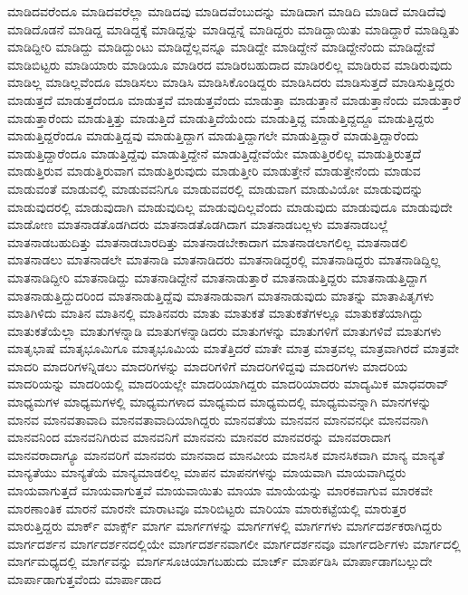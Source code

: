 {ಮಾಡಿದವರೆಂದೂ
ಮಾಡಿದವರೆಲ್ಲಾ
ಮಾಡಿದವು
ಮಾಡಿದವೆಂಬುದನ್ನು
ಮಾಡಿದಾಗ
ಮಾಡಿದಿ
ಮಾಡಿದೆ
ಮಾಡಿದೆವು
ಮಾಡಿದೊಡನೆ
ಮಾಡಿದ್ದ
ಮಾಡಿದ್ದಕ್ಕೆ
ಮಾಡಿದ್ದನ್ನು
ಮಾಡಿದ್ದನ್ನೆ
ಮಾಡಿದ್ದರು
ಮಾಡಿದ್ದಾಯಿತು
ಮಾಡಿದ್ದಾರೆ
ಮಾಡಿದ್ದಿತು
ಮಾಡಿದ್ದೀರಿ
ಮಾಡಿದ್ದು
ಮಾಡಿದ್ದುಂಟು
ಮಾಡಿದ್ದೆಲ್ಲವನ್ನೂ
ಮಾಡಿದ್ದೇ
ಮಾಡಿದ್ದೇನೆ
ಮಾಡಿದ್ದೇನೆಂದು
ಮಾಡಿದ್ದೇವೆ
ಮಾಡಿಬಿಟ್ಟರು
ಮಾಡಿಯಾರು
ಮಾಡಿಯೂ
ಮಾಡಿರದ
ಮಾಡಿರಬಹುದಾದ
ಮಾಡಿರಲಿಲ್ಲ
ಮಾಡಿರುವ
ಮಾಡಿರುವುದು
ಮಾಡಿಲ್ಲ
ಮಾಡಿಲ್ಲವೆಂದೂ
ಮಾಡಿಸಲು
ಮಾಡಿಸಿ
ಮಾಡಿಸಿಕೊಂಡಿದ್ದರು
ಮಾಡಿಸಿದರು
ಮಾಡಿಸುತ್ತದೆ
ಮಾಡಿಸುತ್ತಿದ್ದರು
ಮಾಡುತ್ತದೆ
ಮಾಡುತ್ತದೆಂದೂ
ಮಾಡುತ್ತವೆ
ಮಾಡುತ್ತವೆಂದು
ಮಾಡುತ್ತಾ
ಮಾಡುತ್ತಾನೆ
ಮಾಡುತ್ತಾನೆಂದು
ಮಾಡುತ್ತಾರೆ
ಮಾಡುತ್ತಾರೆಂದು
ಮಾಡುತ್ತಿತ್ತು
ಮಾಡುತ್ತಿದೆ
ಮಾಡುತ್ತಿದೆಯೆಂದು
ಮಾಡುತ್ತಿದ್ದ
ಮಾಡುತ್ತಿದ್ದದ್ದೂ
ಮಾಡುತ್ತಿದ್ದರು
ಮಾಡುತ್ತಿದ್ದರೆಂದೂ
ಮಾಡುತ್ತಿದ್ದವು
ಮಾಡುತ್ತಿದ್ದಾಗ
ಮಾಡುತ್ತಿದ್ದಾಗಲೇ
ಮಾಡುತ್ತಿದ್ದಾರೆ
ಮಾಡುತ್ತಿದ್ದಾರೆಂದು
ಮಾಡುತ್ತಿದ್ದಾರೆಂದೂ
ಮಾಡುತ್ತಿದ್ದೆವು
ಮಾಡುತ್ತಿದ್ದೇನೆ
ಮಾಡುತ್ತಿದ್ದೇವೆಯೇ
ಮಾಡುತ್ತಿರಲಿಲ್ಲ
ಮಾಡುತ್ತಿರುತ್ತದೆ
ಮಾಡುತ್ತಿರುವ
ಮಾಡುತ್ತಿರುವಾಗ
ಮಾಡುತ್ತಿರುವುದು
ಮಾಡುತ್ತೀರಿ
ಮಾಡುತ್ತೇನೆ
ಮಾಡುತ್ತೇನೆಂದು
ಮಾಡುವ
ಮಾಡುವಂತೆ
ಮಾಡುವಲ್ಲಿ
ಮಾಡುವವನಿಗೂ
ಮಾಡುವವರಲ್ಲಿ
ಮಾಡುವಾಗ
ಮಾಡುವಿಯೋ
ಮಾಡುವುದನ್ನು
ಮಾಡುವುದರಲ್ಲಿ
ಮಾಡುವುದಾಗಿ
ಮಾಡುವುದಿಲ್ಲ
ಮಾಡುವುದಿಲ್ಲವೆಂದು
ಮಾಡುವುದು
ಮಾಡುವುದೂ
ಮಾಡುವುದೇ
ಮಾಡೋಣ
ಮಾತನಾಡತೊಡಗಿದರು
ಮಾತನಾಡತೊಡಗಿದಾಗ
ಮಾತನಾಡಬಲ್ಲಳು
ಮಾತನಾಡಬಲ್ಲೆ
ಮಾತನಾಡಬಹುದಿತ್ತು
ಮಾತನಾಡಬಾರದಿತ್ತು
ಮಾತನಾಡಬೇಕಾದಾಗ
ಮಾತನಾಡಲಾಗಲಿಲ್ಲ
ಮಾತನಾಡಲಿ
ಮಾತನಾಡಲು
ಮಾತನಾಡಲೇ
ಮಾತನಾಡಿ
ಮಾತನಾಡಿದರು
ಮಾತನಾಡಿದ್ದರಲ್ಲಿ
ಮಾತನಾಡಿದ್ದರು
ಮಾತನಾಡಿದ್ದಿಲ್ಲ
ಮಾತನಾಡಿದ್ದೀರಿ
ಮಾತನಾಡಿದ್ದು
ಮಾತನಾಡಿದ್ದೇನೆ
ಮಾತನಾಡುತ್ತಾರೆ
ಮಾತನಾಡುತ್ತಿದ್ದರು
ಮಾತನಾಡುತ್ತಿದ್ದಾಗ
ಮಾತನಾಡುತ್ತಿದ್ದುದರಿಂದ
ಮಾತನಾಡುತ್ತಿದ್ದೆವು
ಮಾತನಾಡುವಾಗ
ಮಾತನಾಡುವುದು
ಮಾತನ್ನು
ಮಾತಾಪಿತೃಗಳು
ಮಾತಿಗಿಳಿದು
ಮಾತಿನ
ಮಾತಿನಲ್ಲಿ
ಮಾತಿನವರು
ಮಾತು
ಮಾತುಕತೆ
ಮಾತುಕತೆಗಳಲ್ಲೂ
ಮಾತುಕತೆಯಾಗಿದ್ದು
ಮಾತುಕತೆಯೆಲ್ಲಾ
ಮಾತುಗಳನ್ನಾಡಿ
ಮಾತುಗಳನ್ನಾಡಿದರು
ಮಾತುಗಳನ್ನು
ಮಾತುಗಳಿಗೆ
ಮಾತುಗಳಿವೆ
ಮಾತುಗಳು
ಮಾತೃಭಾಷೆ
ಮಾತೃಭೂಮಿಗೂ
ಮಾತೃಭೂಮಿಯ
ಮಾತೆತ್ತಿದರೆ
ಮಾತೇ
ಮಾತ್ರ
ಮಾತ್ರವಲ್ಲ
ಮಾತ್ರವಾಗಿರದೆ
ಮಾತ್ರವೇ
ಮಾದರಿ
ಮಾದರಿಗಳನ್ನಿಡಲು
ಮಾದರಿಗಳನ್ನು
ಮಾದರಿಗಳಿಗೆ
ಮಾದರಿಗಳಿದ್ದವು
ಮಾದರಿಗಳು
ಮಾದರಿಯ
ಮಾದರಿಯನ್ನು
ಮಾದರಿಯಲ್ಲಿ
ಮಾದರಿಯಲ್ಲೇ
ಮಾದರಿಯಾಗಿದ್ದರು
ಮಾದರಿಯಾದರು
ಮಾದ್ಯಮಿಕ
ಮಾಧವರಾವ್
ಮಾಧ್ಯಮಗಳ
ಮಾಧ್ಯಮಗಳಲ್ಲಿ
ಮಾಧ್ಯಮಗಳಾದ
ಮಾಧ್ಯಮದ
ಮಾಧ್ಯಮದಲ್ಲಿ
ಮಾಧ್ಯಮವನ್ನಾಗಿ
ಮಾನಗಳನ್ನು
ಮಾನವ
ಮಾನವತಾವಾದಿ
ಮಾನವತಾವಾದಿಯಾಗಿದ್ದರು
ಮಾನವತೆಯ
ಮಾನವನ
ಮಾನವನಧೀ
ಮಾನವನಾಗಿ
ಮಾನವನಿಂದ
ಮಾನವನಿಗಿರುವ
ಮಾನವನಿಗೆ
ಮಾನವನು
ಮಾನವರ
ಮಾನವರನ್ನು
ಮಾನವರಾದಾಗ
ಮಾನವರಾದಾಗ್ಯೂ
ಮಾನವರಿಗೆ
ಮಾನವರು
ಮಾನವಾದ
ಮಾನವೀಯ
ಮಾನಸಿಕ
ಮಾನಸಿಕವಾಗಿ
ಮಾನ್ಯ
ಮಾನ್ಯತೆ
ಮಾನ್ಯತೆಯು
ಮಾನ್ಯತೆಯೆ
ಮಾನ್ಯಮಾಡಲಿಲ್ಲ
ಮಾಪನ
ಮಾಪನಗಳನ್ನು
ಮಾಯವಾಗಿ
ಮಾಯವಾಗಿದ್ದರು
ಮಾಯವಾಗುತ್ತದೆ
ಮಾಯವಾಗುತ್ತವೆ
ಮಾಯವಾಯಿತು
ಮಾಯಾ
ಮಾಯೆಯನ್ನು
ಮಾರಕವಾಗುವ
ಮಾರಕವೇ
ಮಾರಣಾಂತಿಕ
ಮಾರನೆ
ಮಾರನೇ
ಮಾರಾಟವೂ
ಮಾರಿಬಿಟ್ಟರು
ಮಾರಿಯಾ
ಮಾರುಕಟ್ಟೆಯಲ್ಲಿ
ಮಾರುತ್ತರ
ಮಾರುತ್ತಿದ್ದರು
ಮಾರ್ಕ್
ಮಾರ್ಕ್ಸ್
ಮಾರ್ಗ
ಮಾರ್ಗಗಳನ್ನು
ಮಾರ್ಗಗಳಲ್ಲಿ
ಮಾರ್ಗಗಳು
ಮಾರ್ಗದರ್ಶಕರಾಗಿದ್ದರು
ಮಾರ್ಗದರ್ಶನ
ಮಾರ್ಗದರ್ಶನದಲ್ಲಿಯೇ
ಮಾರ್ಗದರ್ಶನವಾಗಲೀ
ಮಾರ್ಗದರ್ಶನವೂ
ಮಾರ್ಗದರ್ಶಿಗಳು
ಮಾರ್ಗದಲ್ಲಿ
ಮಾರ್ಗಮಧ್ಯದಲ್ಲಿ
ಮಾರ್ಗವನ್ನು
ಮಾರ್ಗಸೂಚಿಯಾಗಬಹುದು
ಮಾರ್ಚ್
ಮಾರ್ಪಡಿಸಿ
ಮಾರ್ಪಾಡಾಗಬಲ್ಲುದೇ
ಮಾರ್ಪಾಡಾಗುತ್ತವೆಂದು
ಮಾರ್ಪಾಡಾದ
}
